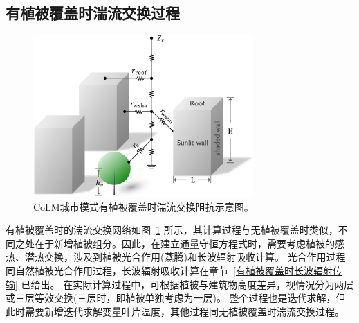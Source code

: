 \subsection{有植被覆盖时湍流交换过程}
{
\begin{figure}[htbp]
\centering
\includegraphics[width=0.75\textwidth]{Figures/城市模式/CoLM城市模式包含植被湍流交换阻抗网络.png}
\caption{CoLM城市模式有植被覆盖时湍流交换阻抗示意图。}
\label{fig:有植被覆盖时城市湍流交换阻抗示意图}
\end{figure}
}
有植被覆盖时的湍流交换网络如图~\ref{fig:有植被覆盖时城市湍流交换阻抗示意图} 所示，其计算过程与无植被覆盖时类似，不同之处在于新增植被组分。因此，在建立通量守恒方程式时，需要考虑植被的感热、潜热交换，涉及到植被光合作用(蒸腾)和长波辐射吸收计算。
光合作用过程同自然植被光合作用过程，长波辐射吸收计算在章节~\ref{有植被覆盖时长波辐射传输} 已给出。
在实际计算过程中，可根据植被与建筑物高度差异，视情况分为两层或三层等效交换(三层时，即植被单独考虑为一层)。
整个过程也是迭代求解，但此时需要新增迭代求解变量叶片温度，其他过程同无植被覆盖时湍流交换过程。

